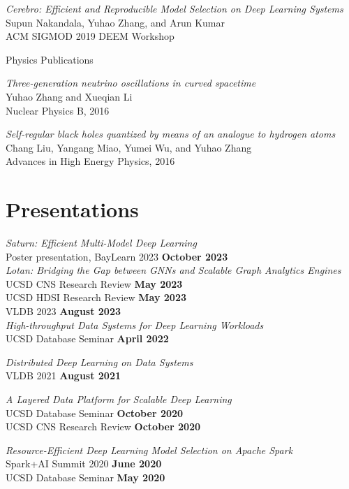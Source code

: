 \documentclass[margin,line]{res}
\begin{document}
\begin{resume}
\textit{Cerebro: Efficient and Reproducible Model Selection on Deep Learning Systems}\\
Supun Nakandala, Yuhao Zhang, and Arun Kumar\\
ACM SIGMOD 2019 DEEM Workshop

{\sc Physics Publications}

\textit{Three-generation neutrino oscillations in curved spacetime}\\
Yuhao Zhang and Xueqian Li\\
Nuclear Physics B, 2016

\textit{Self-regular black holes quantized by means of an analogue to hydrogen atoms}\\
Chang Liu, Yangang Miao, Yumei Wu, and Yuhao Zhang\\
Advances in High Energy Physics, 2016

\section{\sc Presentations}
\textit{Saturn: Efficient Multi-Model Deep Learning}\\
Poster presentation, BayLearn 2023 \hfill {\bf October 2023}\\


\textit{Lotan: Bridging the Gap between GNNs and Scalable Graph Analytics Engines}\\
UCSD CNS Research Review \hfill {\bf May 2023}\\
UCSD HDSI Research Review \hfill {\bf May 2023}\\
VLDB 2023 \hfill {\bf August 2023}\\

\textit{High-throughput Data Systems for Deep Learning Workloads}\\
UCSD Database Seminar \hfill {\bf April 2022}

\textit{Distributed Deep Learning on Data Systems}\\
VLDB 2021 \hfill {\bf August 2021}

\textit{A Layered Data Platform for Scalable Deep Learning}\\
UCSD Database Seminar \hfill {\bf October 2020}\\
UCSD CNS Research Review \hfill {\bf October 2020}

\vspace{-3mm}
\textit{Resource-Efficient Deep Learning Model Selection on Apache Spark}\\
Spark+AI Summit 2020 \hfill {\bf June 2020}\\
UCSD Database Seminar \hfill {\bf May 2020}


\end{resume}
\end{document}
